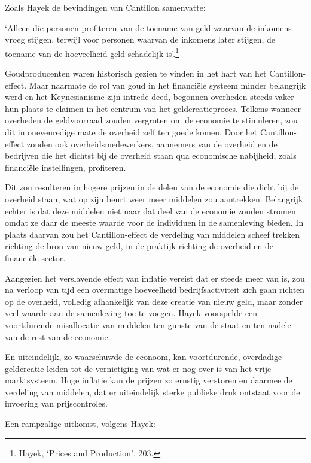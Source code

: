 \documentclass[
  a5paper,
  smalldemyvopaper,11pt,twoside,onecolumn,openright,extrafontsizes]{memoir}
\begin{document}
Zoals Hayek de bevindingen van Cantillon samenvatte:

`Alleen die personen profiteren van de toename van geld waarvan de
inkomens vroeg stijgen, terwijl voor personen waarvan de inkomens later
stijgen, de toename van de hoeveelheid geld schadelijk is'.\footnote{\hspace{0pt}Hayek,
  `Prices and Production', 203.}

Goudproducenten waren historisch gezien te vinden in het hart van het
Cantillon-effect. Maar naarmate de rol van goud in het financiële
systeem minder belangrijk werd en het Keynesianisme zijn intrede deed,
begonnen overheden steeds vaker hun plaats te claimen in het centrum van
het geldcreatieproces. Telkens wanneer overheden de geldvoorraad zouden
vergroten om de economie te stimuleren, zou dit in onevenredige mate de
overheid zelf ten goede komen. Door het Cantillon-effect zouden ook
overheidsmedewerkers, aannemers van de overheid en de bedrijven die het
dichtst bij de overheid staan qua economische nabijheid, zoals
financiële instellingen, profiteren.

Dit zou resulteren in hogere prijzen in de delen van de economie die
dicht bij de overheid staan, wat op zijn beurt weer meer middelen zou
aantrekken. Belangrijk echter is dat deze middelen niet naar dat deel
van de economie zouden stromen omdat ze daar de meeste waarde voor de
individuen in de samenleving bieden. In plaats daarvan zou het
Cantillon-effect de verdeling van middelen scheef trekken richting de
bron van nieuw geld, in de praktijk richting de overheid en de
financiële sector.

Aangezien het verslavende effect van inflatie vereist dat er steeds meer
van is, zou na verloop van tijd een overmatige hoeveelheid
bedrijfsactiviteit zich gaan richten op de overheid, volledig
afhankelijk van deze creatie van nieuw geld, maar zonder veel waarde aan
de samenleving toe te voegen. Hayek voorspelde een voortdurende
misallocatie van middelen ten gunste van de staat en ten nadele van de
rest van de economie.

En uiteindelijk, zo waarschuwde de econoom, kan voortdurende, overdadige
geldcreatie leiden tot de vernietiging van wat er nog over is van het
vrije-marktsysteem. Hoge inflatie kan de prijzen zo ernstig verstoren en
daarmee de verdeling van middelen, dat er uiteindelijk sterke publieke
druk ontstaat voor de invoering van prijscontroles.

Een rampzalige uitkomst, volgens Hayek:
\end{document}
